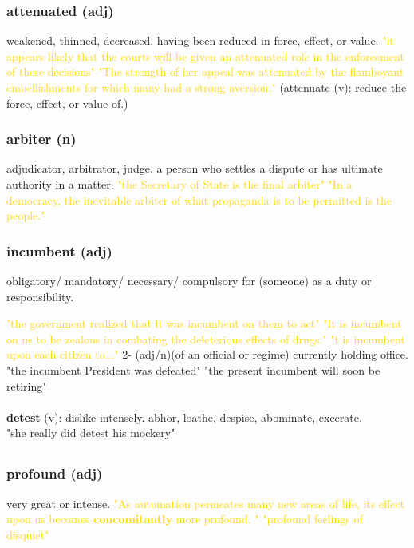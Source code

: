 \documentclass{proc}
\begin{document}
	\subsubsection{\textcolor{brickred}{attenuated} (adj)}
	weakened, thinned, decreased. having been reduced in force, effect, or value.
	\textcolor{gold}{"it appears likely that the courts will be given an attenuated role in the enforcement of these decisions" "The strength of her appeal was attenuated by the flamboyant embellishments for which many had a strong aversion."}
	(attenuate (v): reduce the force, effect, or value of.)
	
	\subsubsection{\textcolor{brickred}{arbiter} (n)}
	adjudicator,
	arbitrator,
	judge. a person who settles a dispute or has ultimate authority in a matter.
	\textcolor{gold}{"the Secretary of State is the final arbiter" "In a democracy, the  inevitable arbiter of what propaganda is to be permitted is the people."}
	
	\subsubsection{\textcolor{brickred}{incumbent} (adj)}
	obligatory/
	mandatory/
	necessary/
	compulsory for (someone) as a duty or responsibility.
	
	\textcolor{gold}{"the government realized that it was incumbent on them to act" "It is incumbent on us to be zealous in combating the deleterious effects of drugs." "t is incumbent upon each citizen to..."}
	2- (adj/n)(of an official or regime) currently holding office.
	"the incumbent President was defeated" "the present incumbent will soon be retiring"
	\\\\
	\textbf{detest} (v): dislike intensely. abhor, loathe, despise, abominate, execrate.\\ "she really did detest his mockery"
	
	\newpage
	\setcounter{section}{32}
	\setcounter{subsection}{0}
	
	
	\subsection{}
	\subsubsection{\textcolor{brickred}{profound} (adj)}
	very great or intense.
	\textcolor{gold}{"As automation permeates many new areas of life, its effect upon us becomes \textbf{concomitantly} more profound. " "profound feelings of disquiet"}
	
\end{document}
